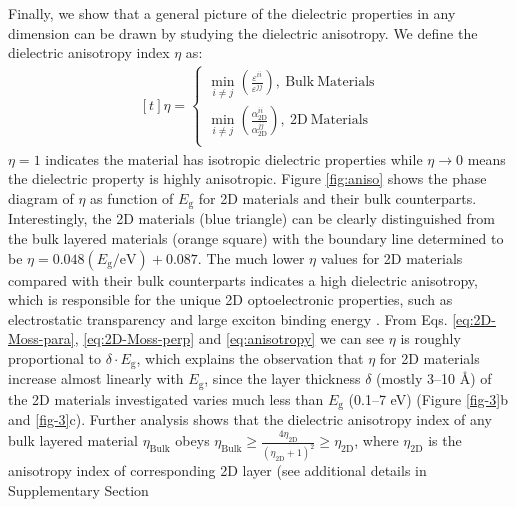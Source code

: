 \documentclass[journal=ancac3,manuscript=article,email=true,hyperref=true,keywords=false]{achemso}
\begin{document}
Finally, we show that a general picture of the dielectric properties in
any dimension can be drawn by studying the dielectric
anisotropy. We define the dielectric anisotropy index $\eta$ as:
\begin{equation}
  \label{eq:anisotropy}
  \begin{aligned}[t]
    \eta =
    \begin{cases}
      {\displaystyle \min_{i \neq j}}
      {\displaystyle
        \left(\frac{\varepsilon^{ii}}{\varepsilon^{jj}}\right)},
      \ \mathrm{Bulk\ Materials}\\
      {\displaystyle \min_{i \neq j}}
      {\displaystyle
        \left(\frac{\alpha_{\mathrm{2D}}^{ii}}{\alpha_{\mathrm{2D}}^{jj}}\right)},
      \ \mathrm{2D\ Materials}\\
    \end{cases}
  \end{aligned}
\end{equation}
$\eta=1$ indicates the material has isotropic dielectric properties
while $\eta \to 0$ means the dielectric property is highly
anisotropic. Figure \ref{fig:aniso} shows the phase diagram of $\eta$
as function of $E_{\mathrm{g}}$ for 2D materials and their bulk
counterparts. Interestingly, the 2D materials (blue triangle) can be
clearly distinguished from the bulk layered materials (orange square)
with the boundary line determined to be
$\eta =0.048 (E_{\mathrm{g}}/ \mathrm{eV})+0.087$. The much lower
$\eta$ values for 2D materials compared with their bulk counterparts
indicates a high dielectric anisotropy, which is responsible for the
unique 2D optoelectronic properties, such as electrostatic
transparency \cite{Liluhua_2014,Tian_2016,Li_2018} and large exciton
binding energy
\cite{Pulci_2014,Tran_2014,Chernikov_2014_EB_MoS2_2D3D,Berkelbach_2013}. From
Eqs. \ref{eq:2D-Moss-para}, \ref{eq:2D-Moss-perp} and
\ref{eq:anisotropy} we can see $\eta$ is roughly proportional to
$\delta \cdot E_{\mathrm{g}}$, which explains the observation that
$\eta$ for 2D materials increase almost linearly with
$E_{\mathrm{g}}$, since the layer thickness $\delta$ (mostly 3--10
\AA{}) of the 2D materials investigated varies much less than
$E_{\mathrm{g}}$ (0.1--7 eV) (Figure \ref{fig-3}b and
\ref{fig-3}c). Further analysis shows that the dielectric anisotropy
index of any bulk layered material $\eta_{\mathrm{Bulk}}$ obeys
$\eta_{\mathrm{Bulk}} \geq {\displaystyle \frac{4
    \eta_{\mathrm{2D}}}{(\eta_{\mathrm{2D}}+1)^{2}}} \geq
\eta_{\mathrm{2D}}$, where $\eta_{\mathrm{2D}}$ is the anisotropy
index of corresponding 2D layer (see additional details in Supplementary Section
\end{document}
